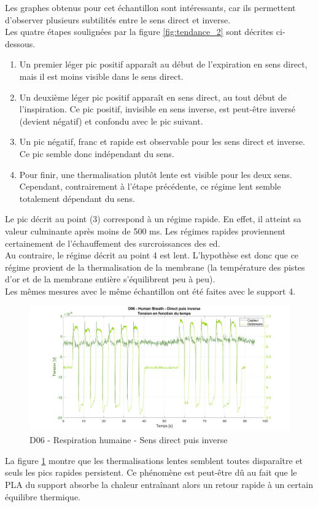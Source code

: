 Les graphes obtenus pour cet échantillon sont intéressants, car ils permettent d'observer plusieurs subtilités entre le sens direct et inverse. \\
Les quatre étapes soulignées par la figure \ref{fig:tendance_2} sont décrites ci-dessous. 
\begin{enumerate}
    \item Un premier léger pic positif apparaît au début de l'expiration en sens direct, mais il est moins visible dans le sens direct.\\
    \item Un deuxième léger pic positif apparaît en sens direct, au tout début de l'inspiration. Ce pic positif, invisible en sens inverse, est
          peut-être inversé (devient négatif) et confondu avec le pic suivant. \\
    \item Un pic négatif, franc et rapide est observable pour les sens direct et inverse. Ce pic semble donc indépendant du sens. \\
    \item Pour finir, une thermalisation plutôt lente est visible pour les deux sens. Cependant, contrairement à l'étape précédente, ce régime
          lent semble totalement dépendant du sens. 
\end{enumerate}
Le pic décrit au point (3) correspond à un régime rapide. En effet, il atteint sa valeur culminante après moins de 500 ms. Les régimes 
rapides proviennent certainement de l'échauffement des surcroissances des \gls{ed}. \\

Au contraire, le régime décrit au point 4 est lent. L'hypothèse est donc que ce régime provient de la thermalisation de la membrane (la 
température des pistes d'or et de la membrane entière s'équilibrent peu à peu). \\

Les mêmes mesures avec le même échantillon ont été faites avec le support 4. 
\begin{figure}[H]
    \hspace{-2.5cm}
    \includegraphics[scale = 0.4]{assets/figures/D06_hb_direct_inverse_green.png}
    \caption{D06 - Respiration humaine - Sens direct puis inverse}
    \label{fig:d06_hb_dirInv}
\end{figure}
La figure \ref{fig:d06_hb_dirInv} montre que les thermalisations lentes semblent toutes disparaître et seuls les pics rapides persistent. Ce phénomène est peut-être dû au fait que le 
PLA du support absorbe la chaleur entraînant alors un retour rapide à un certain équilibre thermique. \\

